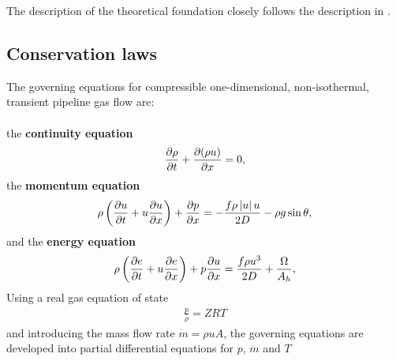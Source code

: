 The description of the theoretical foundation closely follows the description in \cite{Chaczykowski2017}. 

\subsection{Conservation laws}
The governing equations for compressible one-dimensional, non-isothermal, transient pipeline gas flow are: \\\\
the \textbf{continuity equation}
\begin{align}
    \pdt{\rho} + \pdx{(\rho u)} = 0
, \label{eq:contEq}
\end{align}
the \textbf{momentum equation} \cite{Daneshyar1976OneDimensional}
\begin{align}
    \rho\del{\pdt{u} + u \pdx{u}} + \pdx{p} = -\frac{f\rho \abs{u} u}{2D} - \rho g \sin \theta
, \label{eq:momEq}
\end{align}
and the \textbf{energy equation} \cite{White2006Viscous}
\begin{align}
    \rho\del{\pdt{e} + u\pdx{e}} + p\pdx{u} = \frac{f\rho u^3}{2D} + \frac{\Omega}{A_h}
, \label{eq:enEq}
\end{align}
Using a real gas equation of state
\begin{align}
    \frac{p}{\rho} = ZRT
\label{eq:equationOfState}
\end{align}
and introducing the mass flow rate $\dot m = \rho u A$, the governing equations are developed into partial differential equations for $p$, $\dot m$ and $T$
